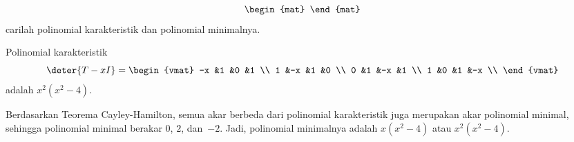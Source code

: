 \begin{exercises}
\begin{equation*}
\begin{mat}
      \end{mat}
    \end{equation*}
    carilah polinomial karakteristik dan polinomial minimalnya.
    \begin{answer}
    Polinomial karakteristik
    \begin{equation*}
      \deter{T-xI}=
      \begin{vmat}
        -x &1  &0  &1 \\
         1 &-x &1  &0 \\
         0 &1  &-x &1 \\
         1 &0  &1  &-x \\
      \end{vmat}
    \end{equation*}
    adalah $x^2(x^2-4)$.

    Berdasarkan Teorema Cayley-Hamilton, semua akar berbeda dari
    polinomial karakteristik juga merupakan akar polinomial minimal, sehingga
    polinomial minimal berakar $0$, $2$, dan~$-2$.
    Jadi, polinomial minimalnya adalah $x(x^2-4)$ atau $x^2(x^2-4)$.
    

\end{answer}
\end{exercises}
